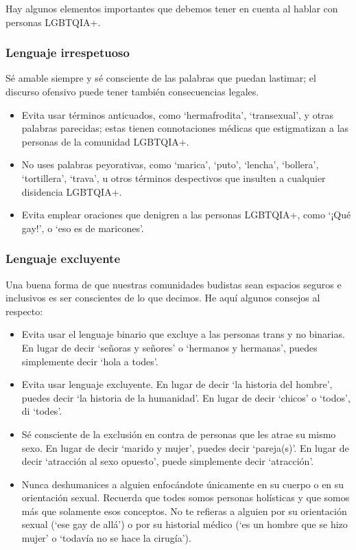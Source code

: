\documentclass[12pt,openany]{book}
\begin{document}
Hay algunos elementos importantes que debemos tener en cuenta al hablar con personas LGBTQIA+.

\subsubsection*{Lenguaje irrespetuoso}

Sé amable siempre y sé consciente de las palabras que puedan lastimar; el discurso ofensivo puede tener también consecuencias legales.

\begin{itemize}
  \setlength\itemsep{-0.3em}
  \item Evita usar términos anticuados, como `hermafrodita', `transexual', y otras palabras parecidas; estas tienen connotaciones médicas que estigmatizan a las personas de la comunidad LGBTQIA+.
  \item No uses palabras peyorativas, como `marica', `puto', `lencha', `bollera', `tortillera', `trava', u otros términos despectivos que insulten a cualquier disidencia LGBTQIA+.
  \item Evita emplear oraciones que denigren a las personas LGBTQIA+, como `¡Qué gay!', o `eso es de maricones'.
\end{itemize}

\subsubsection*{Lenguaje excluyente}

Una buena forma de que nuestras comunidades budistas sean espacios seguros e inclusivos es ser conscientes de lo que decimos. He aquí algunos consejos al respecto:

\begin{itemize}
  \setlength\itemsep{-0.3em}
  \item Evita usar el lenguaje binario que excluye a las personas trans y no binarias. En lugar de decir `señoras y señores' o `hermanos y hermanas', puedes simplemente decir `hola a todes'.
  \item Evita usar lenguaje excluyente. En lugar de decir `la historia del hombre', puedes decir `la historia de la humanidad'. En lugar de decir `chicos' o `todos', di `todes'.
  \item Sé consciente de la exclusión en contra de personas que les atrae su mismo sexo. En lugar de decir `marido y mujer', puedes decir `pareja(s)'. En lugar de decir `atracción al  sexo opuesto', puede simplemente decir `atracción'.
  \item Nunca deshumanices a alguien enfocándote únicamente en su cuerpo o en su orientación sexual. Recuerda que todes somos personas holísticas y que somos más que solamente esos conceptos. No te refieras a alguien por su orientación sexual (`ese gay de allá') o por su historial médico (`es un hombre que se hizo mujer' o `todavía no se hace la cirugía').
\end{itemize}
\end{document}
